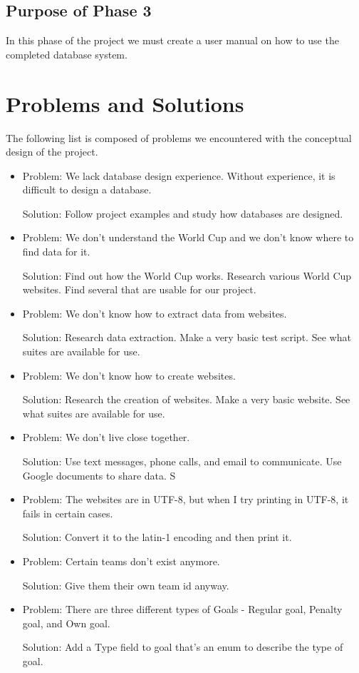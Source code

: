 \documentclass{article}
\begin{document}
\subsection{Purpose of Phase 3}
In this phase of the project we must create a user manual on how to use the 
completed database system.

\section{Problems and Solutions}
The following list is composed of problems we encountered with the conceptual design of the project.
\begin{itemize}
  \item 
  Problem: We lack database design experience. Without experience, it is difficult to design a database.
  
  Solution:  Follow project examples and study how databases are designed.
  \item 
  Problem: We don't understand the World Cup and we don't know where to find data for it.
  
  Solution: Find out how the World Cup works. Research various World Cup websites. Find several that are usable for our project.
  \item 
  Problem:  We don't know how to extract data from websites.
  
  Solution: Research data extraction. Make a very basic test script. See what suites are available for use.
   \item 
  Problem: We don't know how to create websites. 
    
  Solution: Research the creation of websites. Make a very basic website. See what suites are available for use.
  
  \item
  Problem: We don't live close together. 
    
  Solution: Use text messages, phone calls, and email to communicate. Use Google documents to share data.
  S
  
  \item
  Problem: The websites are in UTF-8, but when I try printing in UTF-8, it fails in certain cases.
  
  Solution: Convert it to the latin-1 encoding and then print it.
  
  \item
  Problem: Certain teams don't exist anymore.
  
  Solution: Give them their own team id anyway.
  
  \item
  Problem: There are three different types of Goals - Regular goal, Penalty goal, and Own goal.
  
  Solution: Add a Type field to goal that's an enum to describe the type of goal.
\end{itemize}
\end{document}
